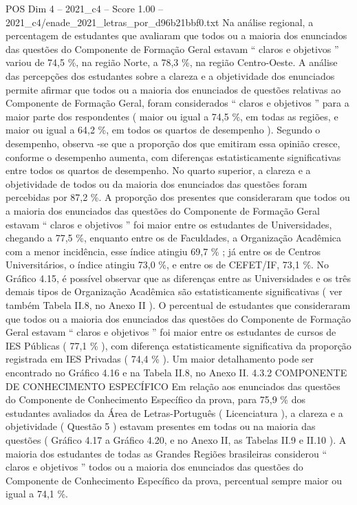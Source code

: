 \begin{textsample}{POS Dim 4 – 2021\_c4 – Score 1.00 – 2021\_c4/enade\_2021\_letras\_por\_d96b21bbf0.txt}
Na análise regional, a percentagem de estudantes que avaliaram que todos ou a maioria dos enunciados das questões do Componente de Formação Geral estavam “ claros e objetivos ” variou de 74,5 \%, na região Norte, a 78,3 \%, na região Centro-Oeste.
A análise das percepções dos estudantes sobre a clareza e a objetividade dos enunciados permite afirmar que todos ou a maioria dos enunciados de questões relativas ao Componente de Formação Geral, foram considerados “ claros e objetivos ” para a maior parte dos respondentes ( maior ou igual a 74,5 \%, em todas as regiões, e maior ou igual a 64,2 \%, em todos os quartos de desempenho ).
Segundo o desempenho, observa -se que a proporção dos que emitiram essa opinião cresce, conforme o desempenho aumenta, com diferenças estatisticamente significativas entre todos os quartos de desempenho.
No quarto superior, a clareza e a objetividade de todos ou da maioria dos enunciados das questões foram percebidas por 87,2 \%.
A proporção dos presentes que consideraram que todos ou a maioria dos enunciados das questões do Componente de Formação Geral estavam “ claros e objetivos ” foi maior entre os estudantes de Universidades, chegando a 77,5 \%, enquanto entre os de Faculdades, a Organização Acadêmica com a menor incidência, esse índice atingiu 69,7 \% ; já entre os de Centros Universitários, o índice atingiu 73,0 \%, e entre os de CEFET/IF, 73,1 \%.
No Gráfico 4.15, é possível observar que as diferenças entre as Universidades e os três demais tipos de Organização Acadêmica são estatisticamente significativas ( ver também Tabela II.8, no Anexo II ).
O percentual de estudantes que consideraram que todos ou a maioria dos enunciados das questões do Componente de Formação Geral estavam “ claros e objetivos ” foi maior entre os estudantes de cursos de IES Públicas ( 77,1 \% ), com diferença estatisticamente significativa da proporção registrada em IES Privadas ( 74,4 \% ).
Um maior detalhamento pode ser encontrado no Gráfico 4.16 e na Tabela II.8, no Anexo II. 4.3.2 COMPONENTE DE CONHECIMENTO ESPECÍFICO Em relação aos enunciados das questões do Componente de Conhecimento Específico da prova, para 75,9 \% dos estudantes avaliados da Área de Letras-Português ( Licenciatura ), a clareza e a objetividade ( Questão 5 ) estavam presentes em todas ou na maioria das questões ( Gráfico 4.17 a Gráfico 4.20, e no Anexo II, as Tabelas II.9 e II.10 ).
A maioria dos estudantes de todas as Grandes Regiões brasileiras considerou “ claros e objetivos ” todos ou a maioria dos enunciados das questões do Componente de Conhecimento Específico da prova, percentual sempre maior ou igual a 74,1 \%.

\end{textsample}
